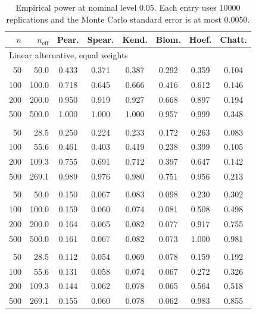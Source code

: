\begin{table}[p]
  \centering
  \small
  \setlength{\tabcolsep}{3.5pt}
  \caption{Empirical power at nominal level $0.05$. Each entry uses 10000 replications and the Monte Carlo standard error is at most $0.0050$.}
  \label{tab:simulation-power}
  \begin{tabular}{rrcccccc}
    \toprule
    $n$ & $n_{\mathrm{eff}}$ & Pear. & Spear. & Kend. & Blom. & Hoef. & Chatt. \\
    \midrule
    \multicolumn{8}{l}{Linear alternative, equal weights} \\
    50 & 50.0 & 0.433 & 0.371 & 0.387 & 0.292 & 0.359 & 0.104 \\
    100 & 100.0 & 0.718 & 0.645 & 0.666 & 0.416 & 0.612 & 0.146 \\
    200 & 200.0 & 0.950 & 0.919 & 0.927 & 0.668 & 0.897 & 0.194 \\
    500 & 500.0 & 1.000 & 1.000 & 1.000 & 0.957 & 0.999 & 0.348 \\
    \addlinespace
    \multicolumn{8}{l}{Linear alternative, unequal weights} \\
    50 & 28.5 & 0.250 & 0.224 & 0.233 & 0.172 & 0.263 & 0.083 \\
    100 & 55.6 & 0.461 & 0.403 & 0.419 & 0.238 & 0.399 & 0.105 \\
    200 & 109.3 & 0.755 & 0.691 & 0.712 & 0.397 & 0.647 & 0.142 \\
    500 & 269.1 & 0.989 & 0.976 & 0.980 & 0.751 & 0.956 & 0.213 \\
    \addlinespace
    \multicolumn{8}{l}{Quadratic alternative, equal weights} \\
    50 & 50.0 & 0.150 & 0.067 & 0.083 & 0.098 & 0.230 & 0.302 \\
    100 & 100.0 & 0.159 & 0.060 & 0.074 & 0.081 & 0.508 & 0.498 \\
    200 & 200.0 & 0.164 & 0.065 & 0.082 & 0.077 & 0.917 & 0.755 \\
    500 & 500.0 & 0.161 & 0.067 & 0.082 & 0.073 & 1.000 & 0.981 \\
    \addlinespace
    \multicolumn{8}{l}{Quadratic alternative, unequal weights} \\
    50 & 28.5 & 0.112 & 0.054 & 0.069 & 0.078 & 0.159 & 0.192 \\
    100 & 55.6 & 0.131 & 0.058 & 0.074 & 0.067 & 0.272 & 0.326 \\
    200 & 109.3 & 0.144 & 0.062 & 0.078 & 0.065 & 0.564 & 0.518 \\
    500 & 269.1 & 0.155 & 0.060 & 0.078 & 0.062 & 0.983 & 0.855 \\
    \bottomrule
  \end{tabular}
\end{table}

